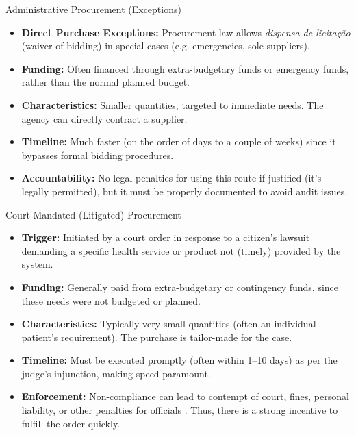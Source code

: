 \documentclass{beamer}
\begin{document}
\begin{frame}{Administrative Procurement (Exceptions)}
\begin{itemize}
  \item \textbf{Direct Purchase Exceptions:} Procurement law allows \emph{dispensa de licita\c{c}\~ao} (waiver of bidding) in special cases (e.g. emergencies, sole suppliers).
  \item \textbf{Funding:} Often financed through extra-budgetary funds or emergency funds, rather than the normal planned budget.
  \item \textbf{Characteristics:} Smaller quantities, targeted to immediate needs. The agency can directly contract a supplier.
  \item \textbf{Timeline:} Much faster (on the order of days to a couple of weeks) since it bypasses formal bidding procedures.
  \item \textbf{Accountability:} No legal penalties for using this route if justified (it's legally permitted), but it must be properly documented to avoid audit issues.
\end{itemize}
\end{frame}

\begin{frame}{Court-Mandated (Litigated) Procurement}
\begin{itemize}
  \item \textbf{Trigger:} Initiated by a court order in response to a citizen’s lawsuit demanding a specific health service or product not (timely) provided by the system.
  \item \textbf{Funding:} Generally paid from extra-budgetary or contingency funds, since these needs were not budgeted or planned.
  \item \textbf{Characteristics:} Typically very small quantities (often an individual patient’s requirement). The purchase is tailor-made for the case.
  \item \textbf{Timeline:} Must be executed promptly (often within 1–10 days) as per the judge’s injunction, making speed paramount.
  \item \textbf{Enforcement:} Non-compliance can lead to contempt of court, fines, personal liability, or other penalties for officials \citep{Delduque2013}. Thus, there is a strong incentive to fulfill the order quickly.
\end{itemize}
\end{frame}
\end{document}
